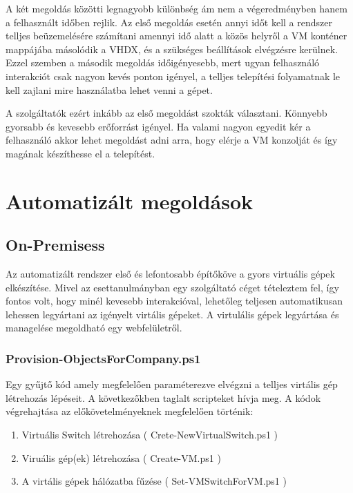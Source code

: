 \documentclass[12pt,oneside,justify,table]{book}
\begin{document}

A két megoldás közötti legnagyobb különbség ám nem a végeredményben hanem a felhasznált időben rejlik. Az első megoldás esetén annyi időt kell a rendszer telljes beüzemelésére számítani amennyi idő alatt a közös helyről a VM konténer mappájába másolódik a VHDX, és a szükséges beállítások elvégzésre kerülnek. Ezzel szemben a második megoldás időigényesebb, mert ugyan felhasználó interakciót csak nagyon kevés ponton igényel, a telljes telepítési folyamatnak le kell zajlani mire használatba lehet venni a gépet. 

A szolgáltatók ezért inkább az első megoldást szokták választani. Könnyebb gyorsabb és kevesebb erőforrást igényel. Ha valami nagyon egyedit kér a felhasználó akkor lehet megoldást adni arra, hogy elérje a VM konzolját és így magának készíthesse el a telepítést.

\section{Automatizált megoldások}

\subsection{On-Premisess}


Az automatizált rendszer első és lefontosabb építőköve a gyors virtuális gépek elkészítése. Mivel az esettanulmányban egy szolgáltató céget tételeztem fel, így fontos volt, hogy minél kevesebb interakcióval, lehetőleg teljesen automatikusan lehessen legyártani az igényelt virtális gépeket. A virtulális gépek legyártása és managelése megoldható egy webfelületről.

\subsubsection{Provision-ObjectsForCompany.ps1}
Egy gyűjtő kód amely megfelelően paraméterezve elvégzni a telljes virtális gép létrehozás lépéseit. 
A következőkben taglalt scripteket hívja meg. 
A kódok végrehajtása az előkövetelményeknek megfelelően történik:
\begin{enumerate}
	\item Virtuális Switch létrehozása ( Crete-NewVirtualSwitch.ps1 )
	\item Viruális gép(ek) létrehozása ( Create-VM.ps1 )
	\item A virtális gépek hálózatba fűzése ( Set-VMSwitchForVM.ps1 )
\end{enumerate}
\end{document}

